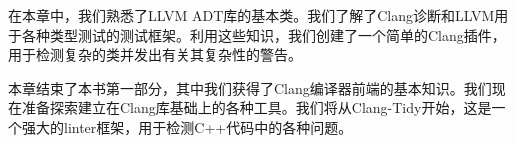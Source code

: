 在本章中，我们熟悉了LLVM ADT库的基本类。我们了解了Clang诊断和LLVM用于各种类型测试的测试框架。利用这些知识，我们创建了一个简单的Clang插件，用于检测复杂的类并发出有关其复杂性的警告。

本章结束了本书第一部分，其中我们获得了Clang编译器前端的基本知识。我们现在准备探索建立在Clang库基础上的各种工具。我们将从Clang-Tidy开始，这是一个强大的linter框架，用于检测C++代码中的各种问题。